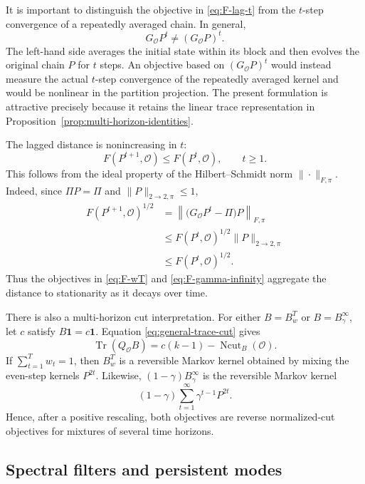 \documentclass[11pt]{article}
\newcommand{\1}{\mathbf{1}}
\begin{document}
It is important to distinguish the objective in
\eqref{eq:F-lag-t} from the $t$-step convergence of a repeatedly
averaged chain.  In general,
\begin{equation*}
    G_{\mathcal O}P^t
    \neq (G_{\mathcal O}P)^t.
\end{equation*}
The left-hand side averages the initial state within its block and
then evolves the original chain $P$ for $t$ steps. An objective based on $(G_{\mathcal O}P)^t$ would instead measure the actual $t$-step convergence of the repeatedly averaged
kernel and would be nonlinear in the partition projection. The present formulation is attractive precisely because it retains the linear trace representation in Proposition~\ref{prop:multi-horizon-identities}.

The lagged distance is nonincreasing in $t$:
\begin{equation*}
    F(P^{t+1},\mathcal O)
    \leq F(P^t,\mathcal O),
    \qquad t\geq1.
\end{equation*}
This follows from the ideal property of the Hilbert--Schmidt norm
$\|\cdot\|_{F,\pi}$. Indeed, since $\Pi P=\Pi$ and
$\|P\|_{2\to2,\pi}\leq1$,
\[
\begin{aligned}
	F(P^{t+1},\mathcal O)^{1/2}
	&=\left\|
	\bigl(G_{\mathcal O}P^t-\Pi\bigr)P
	\right\|_{F,\pi}\\
	&\leq
	F(P^t,\mathcal O)^{1/2}\|P\|_{2\to2,\pi}\\
	&\leq F(P^t,\mathcal O)^{1/2}.
\end{aligned}
\] Thus the objectives in \eqref{eq:F-wT} and \eqref{eq:F-gamma-infinity} aggregate the distance to stationarity as it decays over time.

There is also a multi-horizon cut interpretation.  For either
$B=B_w^T$ or $B=B_\gamma^\infty$, let $c$ satisfy $B\1=c\1$.
Equation \eqref{eq:general-trace-cut} gives
\begin{equation*}
    \operatorname{Tr}(Q_{\mathcal O}B)
    =c(k-1)-\operatorname{Ncut}_B(\mathcal O).
\end{equation*}
If $\sum_{t=1}^T w_t=1$, then $B_w^T$ is a reversible Markov
kernel obtained by mixing the even-step kernels $P^{2t}$.  Likewise,
$(1-\gamma)B_\gamma^\infty$ is the reversible Markov kernel
\[
    (1-\gamma)\sum_{t=1}^\infty
       \gamma^{t-1}P^{2t}.
\]
Hence, after a positive rescaling, both objectives are
reverse normalized-cut objectives for mixtures of several time
horizons.

\subsection{Spectral filters and persistent modes}
\end{document}
